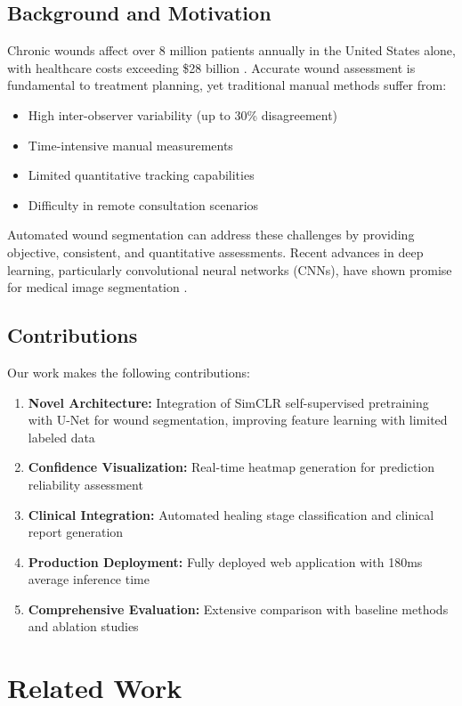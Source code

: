 \documentclass[conference]{IEEEtran}
\begin{document}
\subsection{Background and Motivation}
Chronic wounds affect over 8 million patients annually in the United States alone, with healthcare costs exceeding \$28 billion \cite{wound_statistics}. Accurate wound assessment is fundamental to treatment planning, yet traditional manual methods suffer from:
\begin{itemize}
    \item High inter-observer variability (up to 30\% disagreement) \cite{observer_variability}
    \item Time-intensive manual measurements
    \item Limited quantitative tracking capabilities
    \item Difficulty in remote consultation scenarios
\end{itemize}

Automated wound segmentation can address these challenges by providing objective, consistent, and quantitative assessments. Recent advances in deep learning, particularly convolutional neural networks (CNNs), have shown promise for medical image segmentation \cite{ronneberger2015unet, litjens2017survey}.

\subsection{Contributions}
Our work makes the following contributions:
\begin{enumerate}
    \item \textbf{Novel Architecture:} Integration of SimCLR self-supervised pretraining with U-Net for wound segmentation, improving feature learning with limited labeled data
    \item \textbf{Confidence Visualization:} Real-time heatmap generation for prediction reliability assessment
    \item \textbf{Clinical Integration:} Automated healing stage classification and clinical report generation
    \item \textbf{Production Deployment:} Fully deployed web application with 180ms average inference time
    \item \textbf{Comprehensive Evaluation:} Extensive comparison with baseline methods and ablation studies
\end{enumerate}

\section{Related Work}
\end{document}
